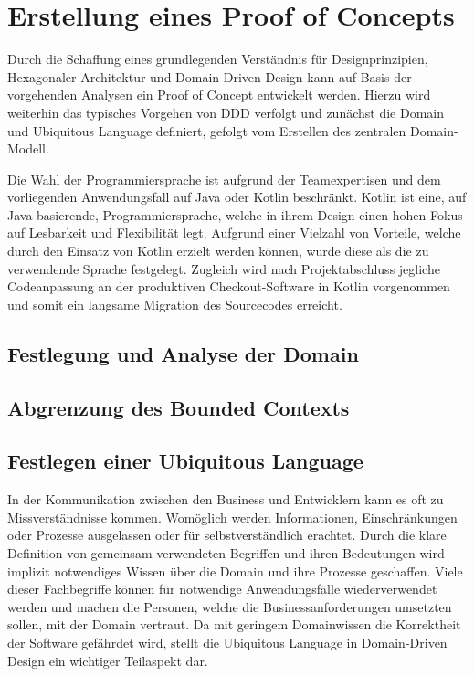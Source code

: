 

\chapter{Erstellung eines Proof of Concepts}

Durch die Schaffung eines grundlegenden Verständnis für Designprinzipien, Hexagonaler Architektur und Domain-Driven Design kann auf Basis der vorgehenden Analysen ein Proof of Concept entwickelt werden. Hierzu wird weiterhin das typisches Vorgehen von DDD verfolgt und zunächst die Domain und Ubiquitous Language definiert, gefolgt vom Erstellen des zentralen Domain-Modell. 

Die Wahl der Programmiersprache ist aufgrund der Teamexpertisen und dem vorliegenden Anwendungsfall auf Java oder Kotlin beschränkt. Kotlin ist eine, auf Java basierende, Programmiersprache, welche in ihrem Design einen hohen Fokus auf Lesbarkeit und Flexibilität legt. Aufgrund einer Vielzahl von Vorteile, welche durch den Einsatz von Kotlin erzielt werden können, wurde diese als die zu verwendende Sprache festgelegt. Zugleich wird nach Projektabschluss jegliche Codeanpassung an der produktiven Checkout-Software in Kotlin vorgenommen und somit ein langsame Migration des Sourcecodes erreicht.


\section{Festlegung und Analyse der Domain}
\blindtext

\section{Abgrenzung des Bounded Contexts}
\blindtext

\section{Festlegen einer Ubiquitous Language}

In der Kommunikation zwischen den Business und Entwicklern kann es oft zu Missverständnisse kommen. Womöglich werden Informationen, Einschränkungen oder Prozesse ausgelassen oder für selbstverständlich erachtet. Durch die klare Definition von gemeinsam verwendeten Begriffen und ihren Bedeutungen wird implizit notwendiges Wissen über die Domain und ihre Prozesse geschaffen. Viele dieser Fachbegriffe können für notwendige Anwendungsfälle wiederverwendet werden und machen die Personen, welche die Businessanforderungen umsetzten sollen, mit der Domain vertraut. Da mit geringem Domainwissen die Korrektheit der Software gefährdet wird, stellt die Ubiquitous Language in Domain-Driven Design ein wichtiger Teilaspekt dar.

